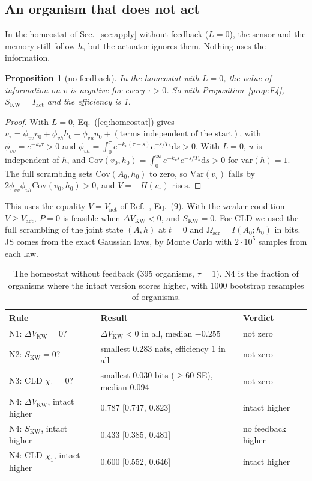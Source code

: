 \documentclass[11pt]{article}
\newtheorem{proposition}{Proposition}
\newcommand{\Vact}{V_{\mathrm{act}}}
\newcommand{\Iact}{I_{\mathrm{act}}}
\newcommand{\DVKW}{\Delta V_{\mathrm{KW}}}
\newcommand{\SKW}{S_{\mathrm{KW}}}
\newcommand{\Oscr}{\Omega_{\mathrm{scr}}}
\begin{document}
\subsection{An organism that does not act}
In the homeostat of Sec.~\ref{sec:apply} without feedback ($L=0$), the sensor and the memory still follow $h$, but the
actuator ignores them. Nothing uses the information.

\begin{proposition}[no feedback]\label{prop:F6}
In the homeostat with $L=0$, the value of information on $v$ is negative for every $\tau>0$. So with
Proposition~\ref{prop:F4}, $\SKW=\Iact$ and the efficiency is 1.
\end{proposition}
\begin{proof}
With $L=0$, Eq.~(\ref{eq:homeostat}) gives $v_\tau=\phi_{vv}v_0+\phi_{vh}h_0+\phi_{vu}u_0+(\text{terms independent of the start})$, with
$\phi_{vv}=e^{-k_v\tau}>0$ and $\phi_{vh}=\int_0^\tau e^{-k_v(\tau-s)}e^{-s/T_h}\mathrm{d}s>0$. With $L=0$, $u$ is
independent of $h$, and $\mathrm{Cov}(v_0,h_0)=\int_0^\infty e^{-k_vs}e^{-s/T_h}\mathrm{d}s>0$ for $\mathrm{var}(h)=1$.
The full scrambling sets $\mathrm{Cov}(A_0,h_0)$ to zero, so $\mathrm{Var}(v_\tau)$ falls by
$2\phi_{vv}\phi_{vh}\mathrm{Cov}(v_0,h_0)>0$, and $V=-H(v_\tau)$ rises.
\end{proof}

This uses the equality $V=\Vact$ of Ref.~\cite{KolchinskyWolpert18}, Eq.~(9). With the weaker condition $V\ge\Vact$,
$P=0$ is feasible when $\DVKW<0$, and $\SKW=0$. For CLD we used the full scrambling of the joint state $(A,h)$ at
$t=0$ and $\Oscr=I(A_0;h_0)$ in bits. JS comes from the exact Gaussian laws, by Monte Carlo with $2\cdot10^5$ samples
from each law.

\begin{table}[t]
\centering
\caption{The homeostat without feedback (395 organisms, $\tau=1$). N4 is the fraction of organisms where the intact
version scores higher, with 1000 bootstrap resamples of organisms.}
\label{tab:c1}
\begin{tabular}{p{4.6cm}p{6.4cm}p{3.0cm}}
\toprule
Rule & Result & Verdict \\
\midrule
N1: $\DVKW=0$? & $\DVKW<0$ in all, median $-0.255$ & not zero \\
N2: $\SKW=0$? & smallest 0.283 nats, efficiency 1 in all & not zero \\
N3: CLD $\chi_1=0$? & smallest 0.030 bits ($\ge60$ SE), median 0.094 & not zero \\
N4: $\DVKW$, intact higher & 0.787 [0.747, 0.823] & intact higher \\
N4: $\SKW$, intact higher & 0.433 [0.385, 0.481] & no feedback higher \\
N4: CLD $\chi_1$, intact higher & 0.600 [0.552, 0.646] & intact higher \\
\bottomrule
\end{tabular}
\end{table}
\end{document}
